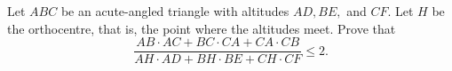 Let $ABC$ be an acute-angled triangle with altitudes $AD,BE,$ and $CF$. Let $H$ be the orthocentre, that is, the point where the altitudes meet. Prove that \[\frac{AB\cdot AC+BC\cdot CA+CA\cdot CB}{AH\cdot AD+BH\cdot BE+CH\cdot CF}\leq 2.\]